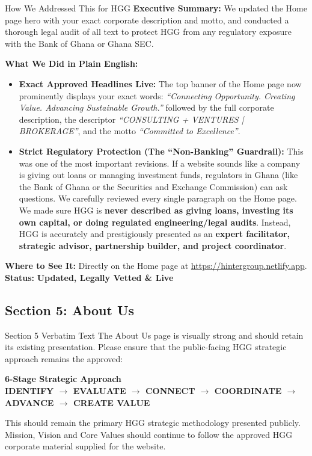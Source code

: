 \documentclass[11pt,a4paper]{article}
\begin{document}
\begin{DetailedResolutionBox}{How We Addressed This for HGG}
\textbf{Executive Summary:} We updated the Home page hero with your exact corporate description and motto, and conducted a thorough legal audit of all text to protect HGG from any regulatory exposure with the Bank of Ghana or Ghana SEC.

\textbf{What We Did in Plain English:}
\begin{itemize}
    \item \textbf{Exact Approved Headlines Live:} The top banner of the Home page now prominently displays your exact words: \textit{``Connecting Opportunity. Creating Value. Advancing Sustainable Growth.''} followed by the full corporate description, the descriptor \textit{``CONSULTING + VENTURES | BROKERAGE''}, and the motto \textit{``Committed to Excellence''}.
    \item \textbf{Strict Regulatory Protection (The ``Non-Banking'' Guardrail):} This was one of the most important revisions. If a website sounds like a company is giving out loans or managing investment funds, regulators in Ghana (like the Bank of Ghana or the Securities and Exchange Commission) can ask questions. We carefully reviewed every single paragraph on the Home page. We made sure HGG is \textbf{never described as giving loans, investing its own capital, or doing regulated engineering/legal audits}. Instead, HGG is accurately and prestigiously presented as an \textbf{expert facilitator, strategic advisor, partnership builder, and project coordinator}.
\end{itemize}

\textbf{Where to See It:} Directly on the Home page at \url{https://hintergroup.netlify.app}. \\
\textbf{Status:} \textcolor{HGGGreen}{\textbf{Updated, Legally Vetted \& Live}}
\end{DetailedResolutionBox}

\vspace{0.3cm}

\subsection{Section 5: About Us}

\begin{VerbatimClientBox}{Section 5 Verbatim Text}
The About Us page is visually strong and should retain its existing presentation.
Please ensure that the public-facing HGG strategic approach remains the approved:
\begin{center}
\textbf{6-Stage Strategic Approach} \\
\textbf{IDENTIFY $\rightarrow$ EVALUATE $\rightarrow$ CONNECT $\rightarrow$ COORDINATE $\rightarrow$ ADVANCE $\rightarrow$ CREATE VALUE}
\end{center}
This should remain the primary HGG strategic methodology presented publicly.
Mission, Vision and Core Values should continue to follow the approved HGG corporate material supplied for the website.
\end{VerbatimClientBox}
\end{document}
